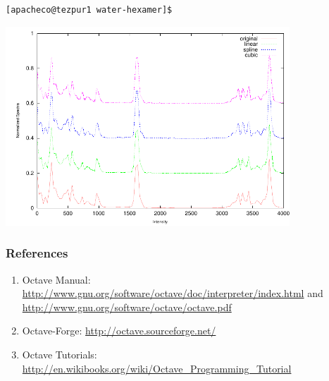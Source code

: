 \documentclass[t,compress,xcolor=svgnames]{beamer}
\begin{document}
\begin{frame}
\begin{itemize}
{\begin{verbatim}
[apacheco@tezpur1 water-hexamer]$
    \end{verbatim}
  }
  \end{itemize}
  \begin{center}
    \includegraphics[width=0.8\textwidth]{./spectra}
  \end{center}
\end{frame}

\begin{frame}
  \frametitle{\small References}
  \begin{enumerate}
    \item Octave Manual: \url{http://www.gnu.org/software/octave/doc/interpreter/index.html} and \url{http://www.gnu.org/software/octave/octave.pdf}
    \item Octave-Forge: \url{http://octave.sourceforge.net/}
    \item Octave Tutorials: \url{http://en.wikibooks.org/wiki/Octave_Programming_Tutorial}
  \end{enumerate}
\end{frame}

\begin{frame}
  \frametitle{}
\end{frame}
\end{document}

